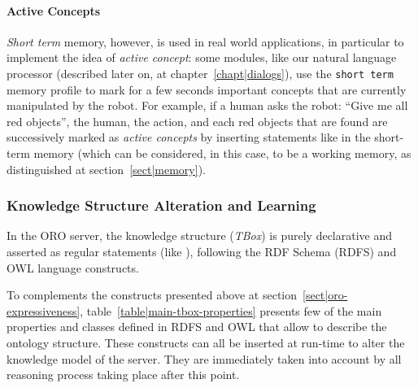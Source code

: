 \paragraph{Active Concepts} \emph{Short term} memory, however, is used in real
world applications, in particular to implement the idea of \emph{active
concept}: some modules, like our natural language processor (described later
on, at chapter~\ref{chapt|dialogs}), use the {\tt short term} memory profile to
mark for a few seconds important concepts that are currently manipulated by the
robot. For example, if a human asks the robot: ``Give me all red objects'', the
human, the  action, and each red objects that are found are
successively marked as \emph{active concepts} by inserting statements like
 in the short-term memory (which can be
considered, in this case, to be a working memory, as distinguished at
section~\ref{sect|memory}).


\subsubsection{Knowledge Structure Alteration and Learning}

In the ORO server, the knowledge structure (\emph{TBox}) is purely declarative
and asserted as regular statements (like ), following the RDF Schema (RDFS) and OWL language constructs.

To complements the constructs presented above at
section~\ref{sect|oro-expressiveness}, table~\ref{table|main-tbox-properties}
presents few of the main properties and classes defined in RDFS and OWL that
allow to describe the ontology structure. These constructs can all be inserted
at run-time to alter the knowledge model of the server. They are immediately
taken into account by all reasoning process taking place after this point.

